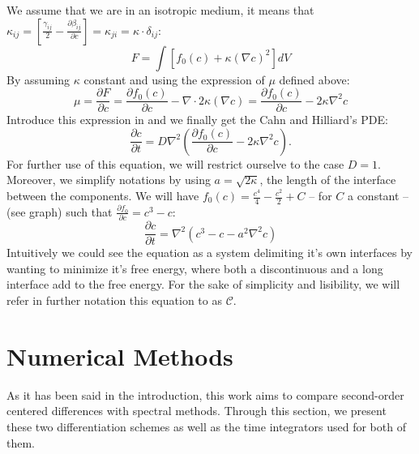 \documentclass[10pt,a4paper,twocolumn]{article}
\begin{document}
We assume that we are in an isotropic medium, it means that $\kappa_{ij} = [\frac{\gamma_{ij}}{2} - \frac{\partial \beta_{ij}}{\partial c}] = \kappa_{ji} = \kappa \cdot\delta_{ij}$:
\begin{equation}
    F = \int [ f_0(c) + \kappa(\nabla c)^2]dV
\end{equation}
By assuming $\kappa$ constant and using the expression of $\mu$ defined above:
\begin{equation}
     \mu = \frac{\partial F}{\partial c} = \frac{\partial f_0(c)}{\partial c} - \nabla \cdot 2\kappa(\nabla c) = \frac{\partial f_0(c)}{\partial c} - 2\kappa\nabla^2 c
\end{equation}
Introduce this expression in  and we finally get the Cahn and Hilliard's PDE:
\begin{equation}
    \frac{\partial c}{\partial t} = D{\nabla^2} \left( \frac{\partial f_0(c)}{\partial c} - 2\kappa\nabla^2 c \right).
\end{equation}
For further use of this equation, we will restrict ourselve to the case $D = 1$. Moreover, we simplify notations by using $a = \sqrt{2\kappa}$, the length of the interface between the components. We will have $f_0(c) = \frac{c^4}{4} - \frac{c^2}{2} + C$ -- for $C$ a constant -- (see graph) such that  $\frac{\partial f_0}{\partial c} = c^3 - c$:
\begin{equation}
	\frac{\partial c}{\partial t} = {\nabla^2}(c^3 -c - a^2\nabla^2 c)
	\label{eq:problem}
\end{equation}
Intuitively we could see the equation as a system delimiting it's own interfaces by wanting to minimize it's free energy, where both a discontinuous and a long interface add to the free energy.
For the sake of simplicity and lisibility, we will refer in further notation this equation to as $\mathcal C$.

\section{Numerical Methods} %
\label{sec:numerical_methods}

As it has been said in the introduction, this work aims to compare second-order centered differences with spectral methods. Through this section, we present these two differentiation schemes as well as the time integrators used for both of them.
\end{document}
